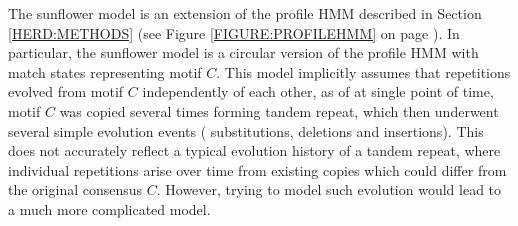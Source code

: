 The sunflower model is an extension of the profile HMM described in Section
\ref{HERD:METHODS} (see Figure \ref{FIGURE:PROFILEHMM} on page
\pageref{FIGURE:PROFILEHMM}). In particular, the sunflower model is a circular
version of the profile HMM with match states representing motif $C$. This model
implicitly assumes that repetitions evolved from motif $C$ independently of
each other, as of at single point of time, motif $C$ was copied several times
forming tandem repeat, which then underwent several simple evolution events (
substitutions, deletions and insertions). This does not accurately reflect a
typical evolution history of a tandem repeat, where individual repetitions
arise over time from existing copies which could differ from the original
consensus $C$. However, trying to model such evolution would lead to a much
more complicated model.


